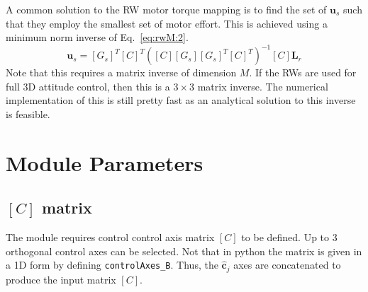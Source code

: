 \documentclass[]{BasiliskReportMemo}
\begin{document}
A common solution to the RW motor torque mapping is to find the set of $\bm u_{s}$ such that they employ the smallest set of motor effort.  This is achieved using a minimum norm inverse of Eq.~\eqref{eq:rwM:2}.
\begin{equation}
	\bm u_{s} = [G_{s}]^{T} [C]^{T} \left( [C] [G_{s}] [G_{s}]^{T} [C]^{T} \right)^{-1} [C] \bm L_{r}
\end{equation}
Note that this requires a matrix inverse of dimension $M$.  If the RWs are used for full 3D attitude control, then this is a $3\times 3$ matrix inverse.  The numerical implementation of this is still pretty fast as an analytical solution to this inverse is feasible.






\section{Module Parameters}


\subsection{$[C]$ matrix}
The module requires control control axis matrix $[C]$ to be defined.  Up to 3 orthogonal control axes can be selected.  Not that in python the matrix is given in a 1D form by defining {\tt controlAxes\_B}.  Thus, the $\hat{\bm c}_{j}$ axes are concatenated to produce the input matrix $[C]$. 



\end{document}
